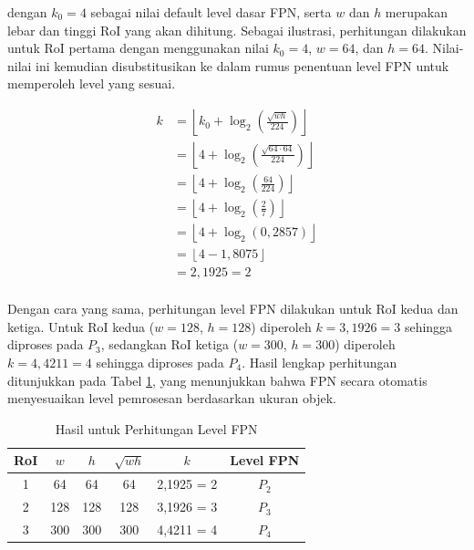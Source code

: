 dengan $k_0 = 4$ sebagai nilai default level dasar FPN, serta $w$ dan $h$ merupakan lebar dan tinggi RoI yang akan dihitung. Sebagai ilustrasi, perhitungan dilakukan untuk RoI pertama dengan menggunakan nilai $k_0 = 4$, $w = 64$, dan $h = 64$. Nilai-nilai ini kemudian disubstitusikan ke dalam rumus penentuan level FPN untuk memperoleh level yang sesuai.

\begin{align*}
    k &= \left\lfloor k_0 + \log_2\left(\frac{\sqrt{wh}}{224}\right) \right\rfloor \\[0.5em]
     &= \left\lfloor 4 + \log_2\left(\frac{\sqrt{64 \cdot 64}}{224}\right) \right\rfloor \\[0.5em]
     &= \left\lfloor 4 + \log_2\left(\frac{64}{224}\right) \right\rfloor \\[0.5em]
     &= \left\lfloor 4 + \log_2\left(\frac{2}{7}\right) \right\rfloor \\[0.5em]
     &= \left\lfloor 4 + \log_2\left(0{,}2857\right) \right\rfloor \\[0.5em]
     &= \left\lfloor 4 - 1{,}8075 \right\rfloor \\[0.5em]
     &= 2{,}1925 = 2 \\[0.5em]
\end{align*}

Dengan cara yang sama, perhitungan level FPN dilakukan untuk RoI kedua dan ketiga. Untuk RoI kedua ($w = 128$, $h = 128$) diperoleh $k = 3{,}1926 = 3$ sehingga diproses pada $P_3$, sedangkan RoI ketiga ($w = 300$, $h = 300$) diperoleh $k = 4{,}4211 = 4$ sehingga diproses pada $P_4$. Hasil lengkap perhitungan ditunjukkan pada Tabel \ref{table:3.hasil-fpn-level}, yang menunjukkan bahwa FPN secara otomatis menyesuaikan level pemrosesan berdasarkan ukuran objek. \par
\begin{table}[H]
\centering
\caption{Hasil untuk Perhitungan Level FPN}
\renewcommand{\arraystretch}{1.3}
\label{table:3.hasil-fpn-level}
\begin{tabular}{|c|c|c|c|c|c|}
\hline
\textbf{RoI} & \textbf{$w$} & \textbf{$h$} & \textbf{$\sqrt{wh}$} & \textbf{$k$} & \textbf{Level FPN}\\ 
\hline
1 & 64 & 64 & 64 & 2{,}1925 = 2 & $P_2$ \\ 
\hline
2 & 128 & 128 & 128 & 3{,}1926 = 3 & $P_3$ \\ 
\hline
3 & 300 & 300 & 300 & 4{,}4211 = 4 & $P_4$ \\
\hline
\end{tabular}
\end{table}


